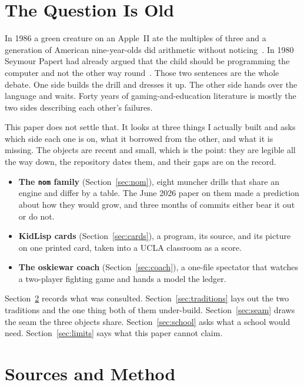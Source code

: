 \documentclass[10pt,letterpaper,twocolumn]{article}
\newcommand{\code}[1]{\texttt{#1}}
\begin{document}
\section{The Question Is Old}
\label{sec:intro}

In 1986 a green creature on an Apple~II ate the multiples of three and a generation of American nine-year-olds did arithmetic without noticing~\citep{mecc1986number}. In 1980 Seymour Papert had already argued that the child should be programming the computer and not the other way round~\citep{papert1980mindstorms}. Those two sentences are the whole debate. One side builds the drill and dresses it up. The other side hands over the language and waits. Forty years of gaming-and-education literature is mostly the two sides describing each other's failures.

This paper does not settle that. It looks at three things I actually built and asks which side each one is on, what it borrowed from the other, and what it is missing. The objects are recent and small, which is the point: they are legible all the way down, the repository dates them, and their gaps are on the record.

\begin{itemize}
  \item \textbf{The \code{nom} family} (Section~\ref{sec:nom}), eight muncher drills that share an engine and differ by a table. The June 2026 paper on them made a prediction about how they would grow, and three months of commits either bear it out or do not.
  \item \textbf{KidLisp cards} (Section~\ref{sec:cards}), a program, its source, and its picture on one printed card, taken into a UCLA classroom as a score.
  \item \textbf{The oskiewar coach} (Section~\ref{sec:coach}), a one-file spectator that watches a two-player fighting game and hands a model the ledger.
\end{itemize}

Section~\ref{sec:method} records what was consulted. Section~\ref{sec:traditions} lays out the two traditions and the one thing both of them under-build. Section~\ref{sec:seam} draws the seam the three objects share. Section~\ref{sec:school} asks what a school would need. Section~\ref{sec:limits} says what this paper cannot claim.

\section{Sources and Method}
\label{sec:method}
\end{document}
